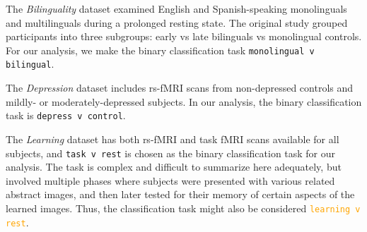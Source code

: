 \documentclass[12pt]{spieman}  %
\newcommand{\code}[1]{\small\texttt{#1}\normalsize}
\begin{document}
\begin{spacing}{2}

The \textit{Bilinguality} dataset\cite{ds001747:1.0.0,
goldcarrieelizabethExploringRestingState2018} examined English and
Spanish-speaking monolinguals and multilinguals during a prolonged resting
state. The original study grouped participants into three subgroups: early vs
late bilinguals vs monolingual
controls\cite{goldcarrieelizabethExploringRestingState2018}. For our analysis,
we make the binary classification task \code{monolingual v
bilingual}.



The \textit{Depression} dataset\cite{bezmaternykhddRestingStateClosed2021,
bezmaternykhBrainNetworksConnectivity2021} includes rs-fMRI scans from
non-depressed controls and mildly- or moderately-depressed subjects. In our
analysis, the binary classification task is \code{depress v control}.


The \textit{Learning} dataset\cite{schapiroHumanHippocampalReplay2018,
schapiroHumanHippocampalReplay2020} has both rs-fMRI and task fMRI scans
available for all subjects, and \code{task v rest} is chosen as the binary
classification task for our analysis.  The task is complex and difficult to
summarize here adequately, but involved multiple phases where subjects were
presented with various related abstract images, and then later tested for their
memory of certain aspects of the learned images. Thus, the classification task
might also be considered \textcolor{orange}{\texttt{learning v rest}}.


\end{spacing}
\end{document}
